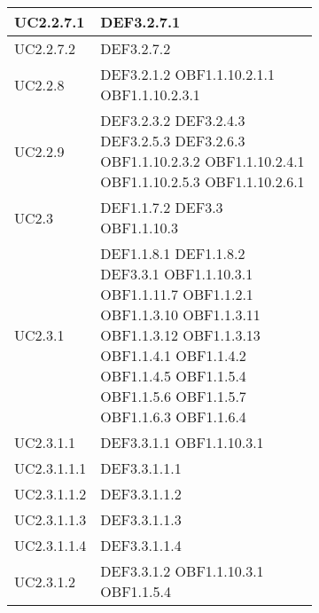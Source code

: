 \documentclass{scalatekids-article}
\begin{document}
\begin{longtable}[H]{|p{5.5cm}|p{5.5cm}|}
  \hline
  UC2.2.7.1 & \multiLineCell[t]{DEF3.2.7.1\\}\\
  \hline
  UC2.2.7.2 & \multiLineCell[t]{DEF3.2.7.2\\}\\
  \hline
  UC2.2.8 & \multiLineCell[t]{DEF3.2.1.2 OBF1.1.10.2.1.1\\OBF1.1.10.2.3.1\\}\\
  \hline
  UC2.2.9 & \multiLineCell[t]{DEF3.2.3.2 DEF3.2.4.3\\DEF3.2.5.3 DEF3.2.6.3\\OBF1.1.10.2.3.2 OBF1.1.10.2.4.1\\OBF1.1.10.2.5.3 OBF1.1.10.2.6.1\\}\\
  \hline
  UC2.3 & \multiLineCell[t]{DEF1.1.7.2 DEF3.3\\OBF1.1.10.3\\}\\
  \hline
  UC2.3.1 & \multiLineCell[t]{DEF1.1.8.1 DEF1.1.8.2\\DEF3.3.1 OBF1.1.10.3.1\\OBF1.1.11.7 OBF1.1.2.1\\OBF1.1.3.10 OBF1.1.3.11\\OBF1.1.3.12 OBF1.1.3.13\\OBF1.1.4.1 OBF1.1.4.2\\OBF1.1.4.5 OBF1.1.5.4\\OBF1.1.5.6 OBF1.1.5.7\\OBF1.1.6.3 OBF1.1.6.4\\}\\
  \hline
  UC2.3.1.1 & \multiLineCell[t]{DEF3.3.1.1 OBF1.1.10.3.1\\}\\
  \hline
  UC2.3.1.1.1 & \multiLineCell[t]{DEF3.3.1.1.1\\}\\
  \hline
  UC2.3.1.1.2 & \multiLineCell[t]{DEF3.3.1.1.2\\}\\
  \hline
  UC2.3.1.1.3 & \multiLineCell[t]{DEF3.3.1.1.3\\}\\
  \hline
  UC2.3.1.1.4 & \multiLineCell[t]{DEF3.3.1.1.4\\}\\
  \hline
  UC2.3.1.2 & \multiLineCell[t]{DEF3.3.1.2 OBF1.1.10.3.1\\OBF1.1.5.4\\}\\

\end{longtable}
\end{document}
